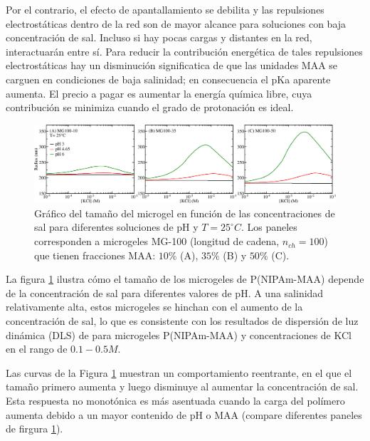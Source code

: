 Por el contrario, el efecto de apantallamiento se debilita y las repulsiones electrost\'aticas dentro de la red son de mayor alcance para soluciones con baja concentraci\'on de sal.
Incluso si hay pocas cargas y distantes en la red, interactuar\'an entre s\'i.
Para reducir la contribuci\'on energ\'etica de tales repulsiones electrost\'aticas hay un disminuci\'on significatica de que  las unidades MAA se carguen en condiciones de baja salinidad;
en consecuencia el pKa aparente aumenta.
El precio a pagar es aumentar la energ\'ia química libre, cuya contribuci\'on se minimiza cuando el grado de protonaci\'on es ideal.



\begin{figure}[!htb]
	\centering
	\includegraphics[width=1\linewidth]{Figures/graph-gel/R-cs.png}
	\caption{Gr\'afico del tama\~no del microgel en funci\'on de las concentraciones de sal para diferentes soluciones de pH y $T=25 ^\circ C$.
		Los paneles corresponden a microgeles MG-100 (longitud de cadena, $n_{ch}=100$) que tienen fracciones MAA: $10\%$ (A), $35\%$ (B) y $50\%$ (C).}
	\label{fig:R-cs}
\end{figure}

La figura \ref{fig:R-cs} ilustra c\'omo el tama\~no de los microgeles de P(NIPAm-MAA) depende de la concentraci\'on de sal para diferentes valores de pH.
A una salinidad relativamente alta, estos microgeles se hinchan con el aumento de la concentraci\'on de sal, lo que es consistente con los resultados de dispersi\'on de luz din\'amica (DLS) de  \cite{Wong2009}para microgeles P(NIPAm-MAA) y concentraciones de KCl en el rango de $0.1-0.5 M$.

Las curvas de la Figura \ref{fig:R-cs} muestran un comportamiento reentrante, en el que el tama\~no primero aumenta y luego disminuye al aumentar la concentración de sal.
Esta respuesta no monot\'onica es m\'as asentuada cuando la carga del pol\'imero aumenta debido a un mayor contenido de pH o MAA (compare diferentes paneles de firgura \ref{fig:R-cs}).



